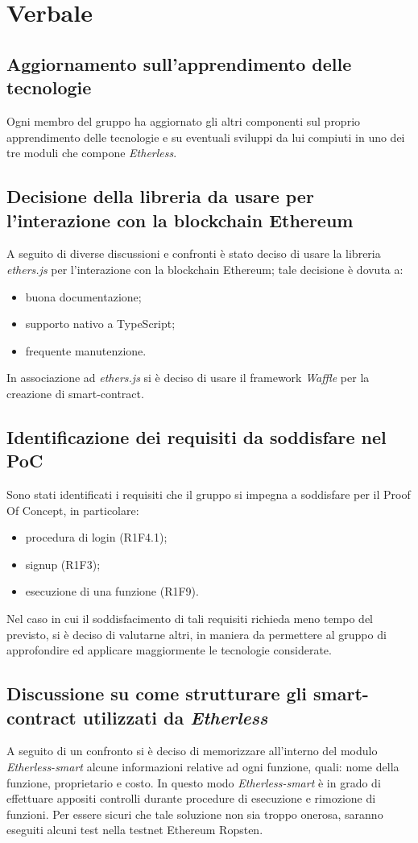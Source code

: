 \section{Verbale}

	\subsection{Aggiornamento sull'apprendimento delle tecnologie}
	Ogni membro del gruppo ha aggiornato gli altri componenti sul proprio apprendimento delle tecnologie e su eventuali sviluppi da lui compiuti in uno dei tre moduli che compone \textit{Etherless}. 
	
	\subsection{Decisione della libreria da usare per l'interazione con la blockchain Ethereum}
	A seguito di diverse discussioni e confronti è stato deciso di usare la libreria \textit{ethers.js} per l'interazione con la blockchain Ethereum; tale decisione è dovuta a: 
		\begin{itemize}
			\item buona documentazione; 
			\item supporto nativo a TypeScript; 
			\item frequente manutenzione. 
		\end{itemize}
	\noindent In associazione ad \textit{ethers.js} si è deciso di usare il framework \textit{Waffle} per la creazione di smart-contract.
	
	\subsection{Identificazione dei requisiti da soddisfare nel PoC}
	Sono stati identificati i requisiti che il gruppo si impegna a soddisfare per il Proof Of Concept, 
	in particolare: 
		\begin{itemize}
			\item procedura di login (R1F4.1); 
			\item signup (R1F3); 
			\item esecuzione di una funzione (R1F9). 
		\end{itemize}
	Nel caso in cui il soddisfacimento di tali requisiti richieda meno tempo del previsto, si è deciso di valutarne altri, in maniera da permettere al gruppo di approfondire ed applicare maggiormente le tecnologie considerate. 
	
	\subsection{Discussione su come strutturare gli smart-contract utilizzati da \textit{Etherless}}
	A seguito di un confronto si è deciso di memorizzare all'interno del modulo \textit{Etherless-smart} alcune informazioni relative ad ogni funzione, quali: nome della funzione, proprietario e costo. In questo modo \textit{Etherless-smart} è in grado di effettuare appositi controlli durante procedure di esecuzione e rimozione di funzioni. 
	Per essere sicuri che tale soluzione non sia troppo onerosa, saranno eseguiti alcuni test nella testnet Ethereum Ropsten. 
	
